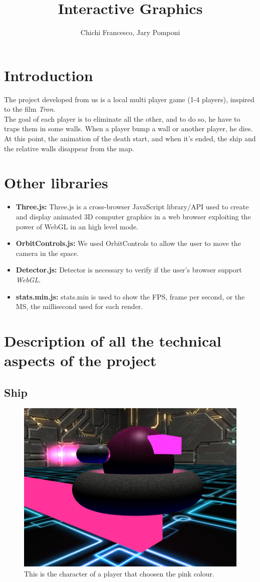 \documentclass[11pt]{article}
\title{Interactive Graphics}
\author{Chichi Francesco, Jary Pomponi}
\begin{document}
\maketitle
\graphicspath{{img/}}
\section{Introduction}
	The project developed from us is a local multi player game (1-4 players), inspired to the film \textit{Tron}.\\
	The goal of each player is to eliminate all the other, and to do so, he have to traps them in some walls.
	When a player bump a wall or another player, he dies. At this point, the animation of the death start, and when it's ended, the ship and the relative walls disappear from the map.
\section{Other libraries}
\begin{itemize}
	\item \textbf{Three.js:}
		Three.js is a cross-browser JavaScript library/API used to create and display animated 3D computer graphics in a web browser exploiting the power of WebGL in an high level mode.
	\item \textbf{OrbitControls.js:}
		We used OrbitControls to allow the user to move the camera in the space.
	\item \textbf{Detector.js:}
		Detector is necessary to verify if the user's browser support \textit{WebGL}.
	\item \textbf{stats.min.js:}
		stats.min is used to show the FPS, frame per second, or the MS, the millisecond used for each render.
		
\end{itemize}
\newpage
\section{Description of all the technical aspects of the project}
\subsection{Ship}
	

	\begin{figure}
		\centering
		\includegraphics[width=0.4\linewidth]{ship}
		\caption{This is the character of a player that choosen the pink colour.}
		\label{fig:ship}
	\end{figure}
\end{document}
